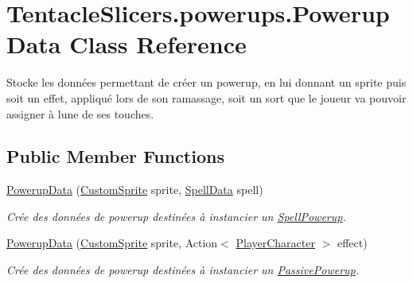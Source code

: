 \hypertarget{class_tentacle_slicers_1_1powerups_1_1_powerup_data}{}\section{Tentacle\+Slicers.\+powerups.\+Powerup\+Data Class Reference}
\label{class_tentacle_slicers_1_1powerups_1_1_powerup_data}


Stocke les données permettant de créer un powerup, en lui donnant un sprite puis soit un effet, appliqué lors de son ramassage, soit un sort que le joueur va pouvoir assigner à l\textquotesingle{}une de ses touches.  


\subsection*{Public Member Functions}
\begin{DoxyCompactItemize}
\item 
\hyperlink{class_tentacle_slicers_1_1powerups_1_1_powerup_data_a55e36b4cbc04fe207ab91a775091e663}{Powerup\+Data} (\hyperlink{class_tentacle_slicers_1_1graphics_1_1_custom_sprite}{Custom\+Sprite} sprite, \hyperlink{class_tentacle_slicers_1_1spells_1_1_spell_data}{Spell\+Data} spell)
\begin{DoxyCompactList}\small\item\em Crée des données de powerup destinées à instancier un \hyperlink{class_tentacle_slicers_1_1powerups_1_1_spell_powerup}{Spell\+Powerup}. \end{DoxyCompactList}\item 
\hyperlink{class_tentacle_slicers_1_1powerups_1_1_powerup_data_a4af3363db0640e2359c2b365e11f762a}{Powerup\+Data} (\hyperlink{class_tentacle_slicers_1_1graphics_1_1_custom_sprite}{Custom\+Sprite} sprite, Action$<$ \hyperlink{class_tentacle_slicers_1_1actors_1_1_player_character}{Player\+Character} $>$ effect)
\begin{DoxyCompactList}\small\item\em Crée des données de powerup destinées à instancier un \hyperlink{class_tentacle_slicers_1_1powerups_1_1_passive_powerup}{Passive\+Powerup}. \end{DoxyCompactList}\end{DoxyCompactItemize}

